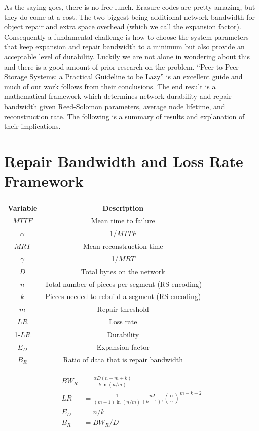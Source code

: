 \documentclass[11pt,fleqn,openany]{book}
\begin{document}
	As the saying goes, there is no free lunch. Erasure codes are pretty amazing, but they do come at a cost. The two biggest being additional network bandwidth for object repair and extra space overhead (which we call the expansion factor). Consequently a fundamental challenge is how to choose the system parameters that keep expansion and repair bandwidth to a minimum but also provide an acceptable level of durability. Luckily we are not alone in wondering about this and there is a good amount of prior research on the problem. ``Peer-to-Peer Storage Systems: a Practical Guideline to be Lazy'' \cite{p2p-lazy} is an excellent guide and much of our work follows from their conclusions. The end result is a mathematical framework which determines network durability and repair bandwidth given Reed-Solomon parameters, average node lifetime, and reconstruction rate. The following is a summary of results and explanation of their implications.

\section{Repair Bandwidth and Loss Rate Framework}
\begin{table}[h]
\centering

\begin{tabular}{| c | c |}\hline
Variable & Description\\\hline
$MTTF$ & Mean time to failure \\
$\alpha$ & 1/$MTTF$\\
$MRT$ & Mean reconstruction time \\
$\gamma$ & 1/$MRT$\\
$D$&Total bytes on the network\\
$n$ & Total number of pieces per segment (RS encoding)\\
$k$ & Pieces needed to rebuild a segment (RS encoding)\\
$m$ & Repair threshold\\
$LR$ & Loss rate\\
1-$LR$ & Durability\\
$E_D$ & Expansion factor\\
$B_R$ & Ratio of data that is repair bandwidth\\
\hline
\end{tabular}
\end{table}

\begin{align*}
BW_R&=\frac{\alpha D(n-m+k)}{k\ln(n/m)}\\
LR&=\frac{1}{(m+1)\ln(n/m)}\frac{m!}{(k-1)!}\left(\frac{\alpha}{\gamma}\right)^{m-k+2}\\
E_D&=n/k\\
B_R&=BW_R/D\\
\end{align*}
\end{document}
